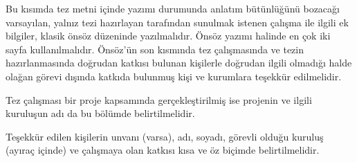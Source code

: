 \hspace{1.25cm}Bu kısımda tez metni içinde yazımı durumunda anlatım bütünlüğünü bozacağı varsayılan, yalnız tezi hazırlayan tarafından sunulmak istenen çalışma ile ilgili ek bilgiler, klasik önsöz düzeninde yazılmalıdır. Önsöz yazımı halinde en çok iki sayfa kullanılmalıdır. Önsöz’ün son kısmında tez çalışmasında ve tezin hazırlanmasında doğrudan katkısı bulunan kişilerle doğrudan ilgili olmadığı halde olağan görevi dışında katkıda bulunmuş kişi ve kurumlara teşekkür edilmelidir. 

Tez çalışması bir proje kapsamında gerçekleştirilmiş ise projenin ve ilgili kuruluşun adı da bu bölümde belirtilmelidir. 

Teşekkür edilen kişilerin unvanı (varsa), adı, soyadı, görevli olduğu kuruluş (ayıraç içinde) ve çalışmaya olan katkısı kısa ve öz biçimde belirtilmelidir.
